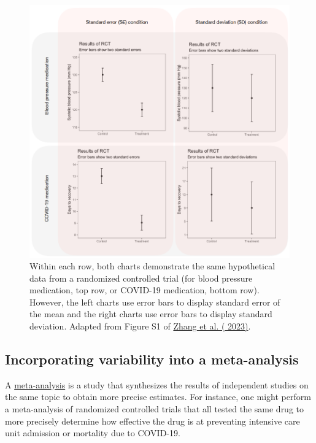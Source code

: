 \documentclass[letterpaper, 12pt]{article}
\begin{document}
\begin{figure}[h!tbp]
    \includegraphics[width=\textwidth]{img/sd_vs_se/zhang_se_vs_sd.png}
    \caption*{Within each row, both charts demonstrate the same hypothetical data from a randomized controlled trial (for blood pressure medication, top row, or COVID-19 medication, bottom row). However, the left charts use error bars to display standard error of the mean and the right charts use error bars to display standard deviation. Adapted from Figure S1 of \href{https://doi.org/10.1073/pnas.2302491120}{Zhang et al. ( 2023)}.}
\end{figure}

\pagebreak

\subsection*{Incorporating variability into a meta-analysis}

A \href{https://en.wikipedia.org/wiki/Meta-analysis}{meta-analysis} is a study that synthesizes the results of independent studies on the same topic to obtain more precise estimates. For instance, one might perform a meta-analysis of randomized controlled trials that all tested the same drug to more precisely determine how effective the drug is at preventing intensive care unit admission or mortality due to COVID-19.
\end{document}
